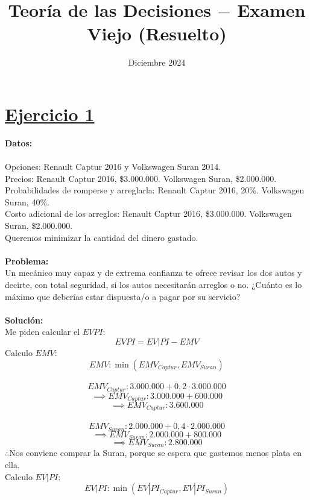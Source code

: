 \documentclass{article}
\title{Teoría de las Decisiones $-$ Examen Viejo (Resuelto)}
\date{Diciembre 2024}
\newcommand{\ulcolor}[2][Red]{\setulcolor{#1}\ul{#2}}
\begin{document}
    \maketitle
    \thispagestyle{main} %

    \section*{\ulcolor[Green]{Ejercicio 1}}
        \textbf{Datos:} \\
        \\
        Opciones: Renault Captur 2016 y Volkswagen Suran 2014. \\
        Precios: Renault Captur 2016, \$3.000.000. Volkswagen Suran, \$2.000.000. \\
        Probabilidades de romperse y arreglarla: Renault Captur 2016, 20\%. Volkswagen Suran, 40\%. \\
        Costo adicional de los arreglos: Renault Captur 2016, \$3.000.000. Volkswagen Suran, \$2.000.000. \\
        Queremos minimizar la cantidad del dinero gastado.
        \\
        \\
        \textbf{Problema:} \\
        Un mecánico muy capaz y de extrema confianza te ofrece revisar los dos autos y decirte, con total seguridad, si los autos necesitarán arreglos o no. ¿Cuánto es lo máximo que deberías estar dispuesta/o a pagar por su servicio?
        \\
        \\
        \textbf{Solución:} \\
        Me piden calcular el $EVPI$:
        \[EVPI = EV|PI - EMV\]
        Calculo $EMV$:
        \[EMV: \min(EMV_{Captur}, EMV_{Suran})\]
        \\
        \[EMV_{Captur}: 3.000.000 + 0,2 \cdot 3.000.000\]
        \[\implies EMV_{Captur}: 3.000.000 + 600.000\]
        \[\implies EMV_{Captur}: 3.600.000\]
        \\
        \[EMV_{Suran}: 2.000.000 + 0,4 \cdot 2.000.000\]
        \[\implies EMV_{Suran}: 2.000.000 + 800.000\]
        \[\implies EMV_{Suran}: 2.800.000\]
        $\therefore$Nos conviene comprar la Suran, porque se espera que gastemos menos plata en ella. \\
        Calculo $EV|PI$:
        \[EV|PI: \min(EV|PI_{Captur}, EV|PI_{Suran})\]
        \\
\end{document}
